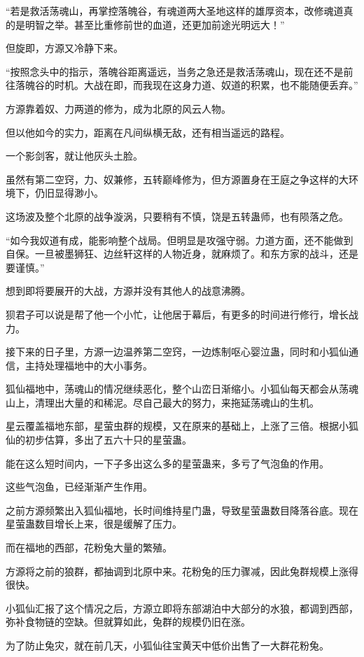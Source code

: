\begin{this_body}
“若是救活荡魂山，再掌控落魄谷，有魂道两大圣地这样的雄厚资本，改修魂道真的是明智之举。甚至比重修前世的血道，还更加前途光明远大！”

但旋即，方源又冷静下来。

“按照念头中的指示，落魄谷距离遥远，当务之急还是救活荡魂山，现在还不是前往落魄谷的时机。大战在即，而我现在这身力道、奴道的积累，也不能随便丢弃。”

方源靠着奴、力两道的修为，成为北原的风云人物。

但以他如今的实力，距离在凡间纵横无敌，还有相当遥远的路程。

一个影剑客，就让他灰头土脸。

虽然有第二空窍，力、奴兼修，五转巅峰修为，但方源置身在王庭之争这样的大环境下，仍旧显得渺小。

这场波及整个北原的战争漩涡，只要稍有不慎，饶是五转蛊师，也有陨落之危。

“如今我奴道有成，能影响整个战局。但明显是攻强守弱。力道方面，还不能做到自保。一旦被墨狮狂、边丝轩这样的人物近身，就麻烦了。和东方家的战斗，还是要谨慎。”

想到即将要展开的大战，方源并没有其他人的战意沸腾。

狈君子可以说是帮了他一个小忙，让他居于幕后，有更多的时间进行修行，增长战力。

接下来的日子里，方源一边温养第二空窍，一边炼制呕心婴泣蛊，同时和小狐仙通信，主持处理福地中的大小事务。

狐仙福地中，荡魂山的情况继续恶化，整个山峦日渐缩小。小狐仙每天都会从荡魂山上，清理出大量的和稀泥。尽自己最大的努力，来拖延荡魂山的生机。

星云覆盖福地东部，星萤虫群的规模，又在原来的基础上，上涨了三倍。根据小狐仙的初步估算，多出了五六十只的星萤蛊。

能在这么短时间内，一下子多出这么多的星萤蛊来，多亏了气泡鱼的作用。

这些气泡鱼，已经渐渐产生作用。

之前方源频繁出入狐仙福地，长时间维持星门蛊，导致星萤蛊数目降落谷底。现在星萤蛊数目增长上来，很是缓解了压力。

而在福地的西部，花粉兔大量的繁殖。

方源将之前的狼群，都抽调到北原中来。花粉兔的压力骤减，因此兔群规模上涨得很快。

小狐仙汇报了这个情况之后，方源立即将东部湖泊中大部分的水狼，都调到西部，弥补食物链的空缺。但就算如此，兔群的规模仍旧在涨。

为了防止兔灾，就在前几天，小狐仙往宝黄天中低价出售了一大群花粉兔。


\end{this_body}
